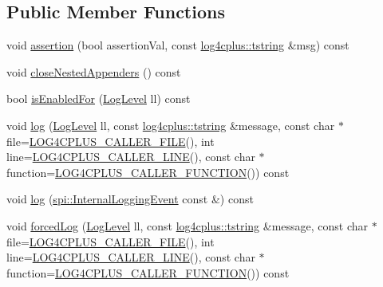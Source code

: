 \subsection*{Public Member Functions}
\begin{DoxyCompactItemize}
\item 
void \hyperlink{classlog4cplus_1_1Logger_a8f2f22cab76546505d416554d8c795a8}{assertion} (bool assertion\-Val, const \hyperlink{namespacelog4cplus_a3c9287f6ebcddc50355e29d71152117b}{log4cplus\-::tstring} \&msg) const 
\item 
void \hyperlink{classlog4cplus_1_1Logger_a29024d28bed7df8f66dd250a931d0614}{close\-Nested\-Appenders} () const 
\item 
bool \hyperlink{classlog4cplus_1_1Logger_a9c7a07a622fe0a083a62d494e45f746b}{is\-Enabled\-For} (\hyperlink{namespacelog4cplus_abd332cc8c98fefcbbdcf57b6b3867de9}{Log\-Level} ll) const 
\item 
void \hyperlink{classlog4cplus_1_1Logger_a4a1cdbb65d8dcdba08e096c6b00a18e7}{log} (\hyperlink{namespacelog4cplus_abd332cc8c98fefcbbdcf57b6b3867de9}{Log\-Level} ll, const \hyperlink{namespacelog4cplus_a3c9287f6ebcddc50355e29d71152117b}{log4cplus\-::tstring} \&message, const char $\ast$file=\hyperlink{config_8hxx_a5144d414ec4fb810aa59271f5d0aeb5e}{L\-O\-G4\-C\-P\-L\-U\-S\-\_\-\-C\-A\-L\-L\-E\-R\-\_\-\-F\-I\-L\-E}(), int line=\hyperlink{config_8hxx_ac1ce89aeb47843333638b5dd1c2167ef}{L\-O\-G4\-C\-P\-L\-U\-S\-\_\-\-C\-A\-L\-L\-E\-R\-\_\-\-L\-I\-N\-E}(), const char $\ast$function=\hyperlink{config_8hxx_a1f16f08f13e1d3c6896c81fdc3b04036}{L\-O\-G4\-C\-P\-L\-U\-S\-\_\-\-C\-A\-L\-L\-E\-R\-\_\-\-F\-U\-N\-C\-T\-I\-O\-N}()) const 
\item 
void \hyperlink{classlog4cplus_1_1Logger_adb8eb1c3ad5dd2ef5a4f7fcf442f19eb}{log} (\hyperlink{classlog4cplus_1_1spi_1_1InternalLoggingEvent}{spi\-::\-Internal\-Logging\-Event} const \&) const 
\item 
void \hyperlink{classlog4cplus_1_1Logger_a1dc28745b1d7800f160f56d02ccfb7c4}{forced\-Log} (\hyperlink{namespacelog4cplus_abd332cc8c98fefcbbdcf57b6b3867de9}{Log\-Level} ll, const \hyperlink{namespacelog4cplus_a3c9287f6ebcddc50355e29d71152117b}{log4cplus\-::tstring} \&message, const char $\ast$file=\hyperlink{config_8hxx_a5144d414ec4fb810aa59271f5d0aeb5e}{L\-O\-G4\-C\-P\-L\-U\-S\-\_\-\-C\-A\-L\-L\-E\-R\-\_\-\-F\-I\-L\-E}(), int line=\hyperlink{config_8hxx_ac1ce89aeb47843333638b5dd1c2167ef}{L\-O\-G4\-C\-P\-L\-U\-S\-\_\-\-C\-A\-L\-L\-E\-R\-\_\-\-L\-I\-N\-E}(), const char $\ast$function=\hyperlink{config_8hxx_a1f16f08f13e1d3c6896c81fdc3b04036}{L\-O\-G4\-C\-P\-L\-U\-S\-\_\-\-C\-A\-L\-L\-E\-R\-\_\-\-F\-U\-N\-C\-T\-I\-O\-N}()) const 

\end{DoxyCompactItemize}

